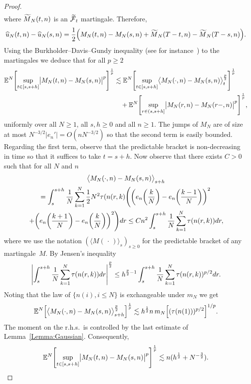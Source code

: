 \documentclass[AHL,Unicode,longabstracts]{cedram}
\theoremstyle{plain}
\newcommand{\bbE}{\mathbb{E}}
\newcommand{\cF}{\mathcal{F}}
\let\oldtilde\tilde
\renewcommand*{\tilde}[1]{\mathchoice{\widetilde{#1}}{\widetilde{#1}}{\oldtilde{#1}}{\oldtilde{#1}}}
\let\oldhat\hat
\renewcommand*{\hat}[1]{\mathchoice{\widehat{#1}}{\widehat{#1}}{\oldhat{#1}}{\oldhat{#1}}}
\let\originalleft\left
\let\originalright\right
\renewcommand{\left}{\mathopen{}\mathclose\bgroup\originalleft}
\renewcommand{\right}{\aftergroup\egroup\originalright}
\begin{document}
\begin{proof}
\begin{multline}
\end{multline}
where $\tilde{M}_N(t,n)$ is an $\tilde{\cF}_t$ martingale. Therefore,
\begin{equation}
\hat{u}_N(t,n)-\hat{u}_N(s,n) =\frac12\Big(M_N(t,n) - M_N(s,n) + \tilde{M}_N(T-t,n) -\tilde{M}_N(T-s,n) \Big).
\end{equation}
Using the Burkholder--Davis--Gundy inequality (see for instance~\cite{BDG}) to the martingales we deduce that for all $p\geq 2$
\begin{align*}
\bbE^N \left[\sup_{t\in [s,s+h]}\bigl|M_N(t,n) - M_N(s,n)\bigr|^p\right]^{\frac{1}{p}} &\lesssim \bbE^N \left[\sup_{t\in [s,s+h]} \bigl\langle M_N(\cdot,n) - M_N(s,n)\bigr\rangle_t^{\frac{p}{2}}\right]^{\frac{1}{p}}\\
&\quad+ \bbE^N\left[\sup_{r\in(s,s+h]} \bigl|M_N(r,n)-M_N(r-,n)\bigr|^p\right]^{\frac{1}{p}},
\end{align*}
uniformly over all $N\geq 1$, all $s,h \ge 0$ and all $n\geq 1$. The jumps of $M_N$ are of size at most $N^{-3/2} | e_n' |=O(n N^{-3/2})$ so that the second term is easily bounded. Regarding the first term, observe that the predictable bracket is non-decreasing in time so that it suffices to take $t=s+h$. Now observe that there exists $C>0$ such that for all $N$ and $n$
\begin{multline*}
\bigl\langle M_N(\cdot,n) - M_N(s,n)\bigr\rangle_{s+h} \\
= \int_s^{s+h} \frac1{N} \sum_{k=1}^N \frac12 N^2 \tau({n(r,k)} \left(\left(e_n\left(\frac{k}{N}\right) - e_n\left(\frac{k-1}{N}\right)\right)^2\right.\\
\left.
+ \left(e_n\left(\frac{k+1}{N}\right) - e_n\left(\frac{k}{N}\right)\right)^2 \right) dr
\le C n^2\int_s^{s+h} \frac1{N} \sum_{k=1}^N\tau({n(r,k)}) dr,
\end{multline*}
where we use the notation $(\langle M(\,\cdot\,) \rangle_{s})_{s\ge 0}$ for the predictable bracket of any martingale~$M$. By Jensen's inequality
\[
\left| \int_s^{s+h} \frac1{N} \sum_{k=1}^N\tau({n(r,k)}) dr \right|^{\frac{p}{2}} \le h^{\frac{p}{2}-1} \int_s^{s+h} \frac1{N} \sum_{k=1}^N\tau({n(r,k)})^{p/2} dr.
\]
Noting that the law of $\{n(i), i\le N\}$ is exchangeable under $m_N$ we get
\[
\bbE^N \left[\bigl\langle M_N(\cdot,n) - M_N(s,n)\bigr\rangle_{s+h}^{\frac{p}{2}}\right]^{\frac{1}{p}} \lesssim h^{\frac12} n\,m_N\left[(\tau({n(1)}))^{p/2}\right]^{1/p}.
\]
The moment on the r.h.s.~is controlled by the last estimate of Lemma~\ref{Lemma:Gaussian}. Consequently,
\[
\bbE^N \left[\sup_{t\in [s,s+h]}\bigl|M_N(t,n) - M_N(s,n)\bigr|^p\right]^{\frac{1}{p}} \lesssim n(h^{\frac{1}{2}} + N^{-\frac{3}{2}}).
\]
\end{proof}
\end{document}
